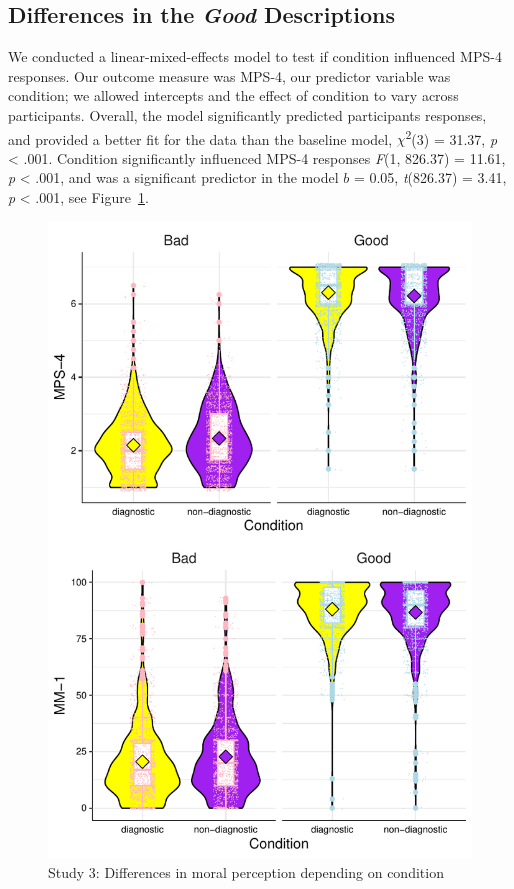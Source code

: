 \documentclass[
  man,floatsintext]{apa7}
\begin{document}
\hypertarget{differences-in-the-good-descriptions}{%
\subsection{\texorpdfstring{Differences in the \emph{Good} Descriptions}{Differences in the Good Descriptions}}\label{differences-in-the-good-descriptions}}

We conducted a linear-mixed-effects model to test if condition influenced MPS-4 responses. Our outcome measure was MPS-4, our predictor variable was condition; we allowed intercepts and the effect of condition to vary across participants. Overall, the model significantly predicted participants responses, and provided a better fit for the data than the baseline model, \(\chi\)\textsuperscript{2}(3) = 31.37, \emph{p} \textless{} .001. Condition significantly influenced MPS-4 responses \emph{F}(1, 826.37) = 11.61, \emph{p} \textless{} .001, and was a significant predictor in the model \(b\) = 0.05, \emph{t}(826.37) = 3.41, \emph{p} \textless{} .001, see Figure~\ref{fig:S3bothconditionplot}.

\begin{figure}
\centering
\includegraphics{Study_6_files/figure-latex/S3bothconditionplot-1.pdf}
\caption{\label{fig:S3bothconditionplot}Study 3: Differences in moral perception depending on condition}
\end{figure}
\end{document}
